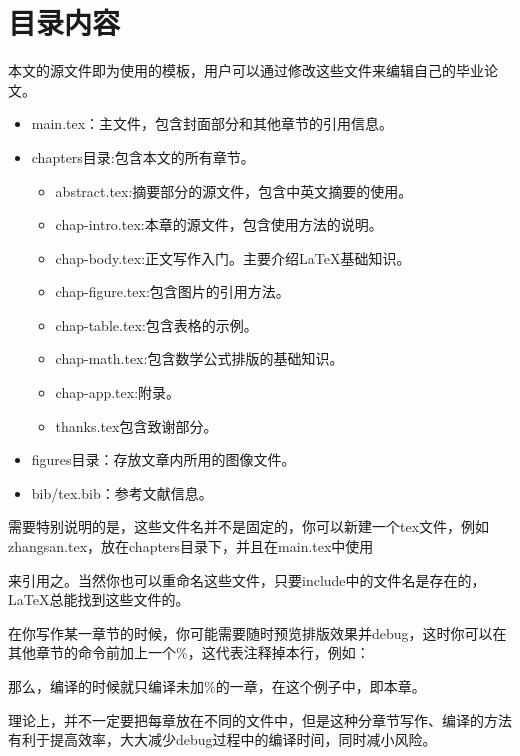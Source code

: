\section{目录内容}
本文的源文件即为使用的模板，用户可以通过修改这些文件来编辑自己的毕业论文。
\begin{itemize}
\item{main.tex}：主文件，包含封面部分和其他章节的引用信息。
\item{chapters目录}:包含本文的所有章节。
\begin{itemize}
\item{abstract.tex}:摘要部分的源文件，包含中英文摘要的使用。
\item{chap-intro.tex}:本章的源文件，包含使用方法的说明。
\item{chap-body.tex}:正文写作入门。主要介绍\LaTeX 基础知识。
\item{chap-figure.tex}:包含图片的引用方法。
\item{chap-table.tex}:包含表格的示例。
\item{chap-math.tex}:包含数学公式排版的基础知识。
\item{chap-app.tex}:附录。
\item{thanks.tex}包含致谢部分。
\end{itemize}
\item{figures目录}：存放文章内所用的图像文件。
\item{bib/tex.bib}：参考文献信息。
\end{itemize}
需要特别说明的是，这些文件名并不是固定的，你可以新建一个tex文件，例如zhangsan.tex，放在chapters目录下，并且在main.tex中使用
\begin{code}
    
\end{code}
来引用之。当然你也可以重命名这些文件，只要include中的文件名是存在的，\LaTeX 总能找到这些文件的。

在你写作某一章节的时候，你可能需要随时预览排版效果并debug，这时你可以在其他章节的\verb||命令前加上一个\%，这代表注释掉本行，例如：
\begin{code}
    \mainmatter
      
\end{code}
那么，编译的时候就只编译未加\%的一章，在这个例子中，即本章。

理论上，并不一定要把每章放在不同的文件中，但是这种分章节写作、编译的方法有利于提高效率，大大减少debug过程中的编译时间，同时减小风险。 